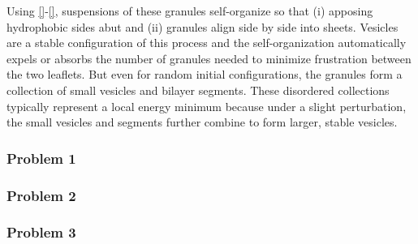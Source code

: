 Using \eqref{}-\eqref{}, suspensions of these granules self-organize
so that (i) apposing hydrophobic sides abut and (ii) granules align
side by side into sheets.  Vesicles are a stable configuration
of this process and the self-organization automatically expels or
absorbs the number of granules needed to minimize frustration between
the two leaflets.  But even for random initial configurations,
the granules form a collection of small vesicles and bilayer segments.
These disordered collections typically represent a local energy minimum 
because under a slight perturbation, the small vesicles and segments
further combine to form larger, stable vesicles.  


\subsubsection{Problem 1}

\subsubsection{Problem 2}

\subsubsection{Problem 3}


%
%
%
%
%
%
